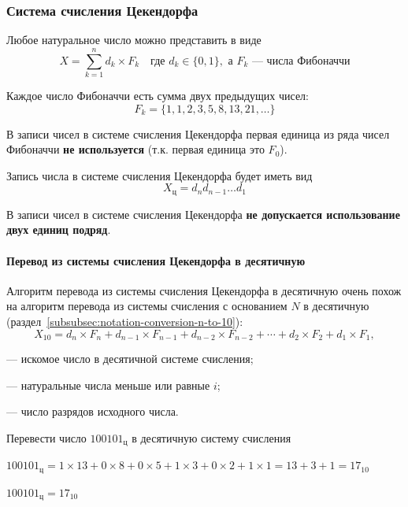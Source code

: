 \subsubsection{Система счисления Цекендорфа}\label{subsubsec:zeckendorfs-notation-system}
Любое натуральное число можно представить в виде
\[
    X = \sum^{n}_{k = 1} d_{k} \times F_{k} \quad \text{где  } d_{k} \in \{0,1\},\text{ а } F_{k} \text{ --- числа Фибоначчи}
\]

Каждое число Фибоначчи есть сумма двух предыдущих чисел:
\[
F_{k} = \{ 1, 1, 2, 3, 5, 8, 13, 21, \dots \}
\]

В записи чисел в системе счисления Цекендорфа первая единица из ряда чисел Фибоначчи \textbf{не используется} (т.к. первая единица это $F_{0}$).

Запись числа в системе счисления Цекендорфа будет иметь вид
\[
    X_{\text{ц}} = d_{n}d_{n-1} \dots d_{1}
\]

В записи чисел в системе счисления Цекендорфа \textbf{не допускается использование двух единиц подряд}.

\paragraph{Перевод из системы счисления Цекендорфа в десятичную}\label{par:zeckendorfs-to-decimal}

Алгоритм перевода из системы счисления Цекендорфа в десятичную очень похож на алгоритм перевода из системы счисления с основанием $N$ в десятичную (раздел~\ref{subsubsec:notation-conversion-n-to-10}):
\[
    X_{10} = d_{n} \times F_{n} + d_{n-1}\times F_{n-1} + d_{n-2} \times F_{n-2} + \cdots + d_{2} \times F_{2} + d_{1} \times F_{1},
\]

\begin{where}
    \item [$X_{10}$] --- искомое число в десятичной системе счисления;
    \item [$d_{i}$] --- натуральные числа меньше или равные $i$;
    \item [$n$] --- число разрядов исходного числа.
\end{where}

\begin{example}
    \task%
    Перевести число $100101_{\text{ц}}$ в десятичную систему счисления

    \solution%
    $100101_{\text{ц}} = 1 \times 13 + 0 \times 8 + 0 \times 5 + 1 \times 3 + 0 \times 2 + 1 \times 1 \allowbreak = 13 + 3 + 1 \allowbreak = 17_{10}$

    \answer%
    $100101_{\text{ц}} = 17_{10}$
\end{example}

